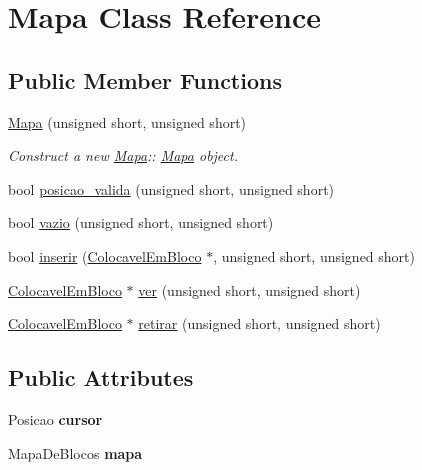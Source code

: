 \hypertarget{class_mapa}{}\section{Mapa Class Reference}
\label{class_mapa}
\subsection*{Public Member Functions}
\begin{DoxyCompactItemize}
\item 
\mbox{\hyperlink{class_mapa_ad722918f4e9150eb37d27de9f2847d5c}{Mapa}} (unsigned short, unsigned short)
\begin{DoxyCompactList}\small\item\em Construct a new \mbox{\hyperlink{class_mapa}{Mapa}}\+:\+: \mbox{\hyperlink{class_mapa}{Mapa}} object. \end{DoxyCompactList}\item 
bool \mbox{\hyperlink{class_mapa_aa07c1444720958b3efbc734d2691361d}{posicao\+\_\+valida}} (unsigned short, unsigned short)
\item 
bool \mbox{\hyperlink{class_mapa_a5bdde997d3c97c5b6fb7d37c124cdf93}{vazio}} (unsigned short, unsigned short)
\item 
bool \mbox{\hyperlink{class_mapa_a4dbab5cd3008b39687d8d2edb0ebacee}{inserir}} (\mbox{\hyperlink{class_colocavel_em_bloco}{Colocavel\+Em\+Bloco}} $\ast$, unsigned short, unsigned short)
\item 
\mbox{\hyperlink{class_colocavel_em_bloco}{Colocavel\+Em\+Bloco}} $\ast$ \mbox{\hyperlink{class_mapa_a52dbdf40a47afb56b1cb35dd1cb552f5}{ver}} (unsigned short, unsigned short)
\item 
\mbox{\hyperlink{class_colocavel_em_bloco}{Colocavel\+Em\+Bloco}} $\ast$ \mbox{\hyperlink{class_mapa_a8c216da0fb1514cb354c40b64d9af93a}{retirar}} (unsigned short, unsigned short)
\end{DoxyCompactItemize}
\subsection*{Public Attributes}
\begin{DoxyCompactItemize}
\item 
\mbox{\label{class_mapa_a510e97a3b1705bd120220da7a1ce1cbf}} 
Posicao {\bfseries cursor}
\item 
\mbox{\label{class_mapa_ae1372f45e15677c1ac55e88e9cb1f240}} 
Mapa\+De\+Blocos {\bfseries mapa}
\end{DoxyCompactItemize}


